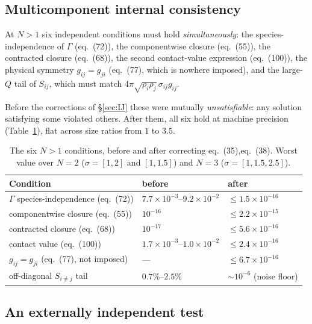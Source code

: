 \documentclass[11pt,a4paper]{article}
\newcommand{\eqBH}[1]{eq.~(#1)}
\begin{document}
\begin{table}[htbp]
\centering\small
\caption{$K\to0$ hard-sphere limit at $N=1$ ($K=10^{-10}$).}
\label{tab:hs}

\end{table}

\subsection{Multicomponent internal consistency}

At $N>1$ six independent conditions must hold \emph{simultaneously}: the
species-independence of $\Gamma$ (\eqBH{72}), the componentwise closure
(\eqBH{55}), the contracted closure (\eqBH{68}), the second contact-value
expression (\eqBH{100}), the physical symmetry $g_{ij}=g_{ji}$ (\eqBH{77},
which is nowhere imposed), and the large-$Q$ tail of $S_{ij}$, which must match
$4\pi\sqrt{\rho_i\rho_j}\,\sigma_{ij}g_{ij}$.

Before the corrections of \S\ref{sec:IJ} these were mutually
\emph{unsatisfiable}: any solution satisfying some violated others. After
them, all six hold at machine precision (Table~\ref{tab:n1cond}), flat across
size ratios from $1$ to $3.5$.

\begin{table}[htbp]
\centering\small
\caption{The six $N>1$ conditions, before and after correcting
\eqBH{35},\eqBH{38}. Worst value over $N=2$ ($\sigma=[1,2]$ and $[1,1.5]$) and
$N=3$ ($\sigma=[1,1.5,2.5]$).}
\label{tab:n1cond}
\begin{tabular}{@{}lll@{}}
\toprule
Condition & before & after\\
\midrule
$\Gamma$ species-independence (\eqBH{72}) & $7.7\times10^{-3}$--$9.2\times10^{-2}$ & $\le1.5\times10^{-16}$\\
componentwise closure (\eqBH{55}) & $10^{-16}$ & $\le2.2\times10^{-15}$\\
contracted closure (\eqBH{68}) & $10^{-17}$ & $\le5.6\times10^{-16}$\\
contact value (\eqBH{100}) & $1.7\times10^{-3}$--$1.0\times10^{-2}$ & $\le2.4\times10^{-16}$\\
$g_{ij}=g_{ji}$ (\eqBH{77}, not imposed) & --- & $\le6.7\times10^{-16}$\\
off-diagonal $S_{i\neq j}$ tail & $0.7\%$--$2.5\%$ & $\sim10^{-6}$ (noise floor)\\
\bottomrule
\end{tabular}
\end{table}

\subsection{An externally independent test}
\label{sec:external}
\end{document}

